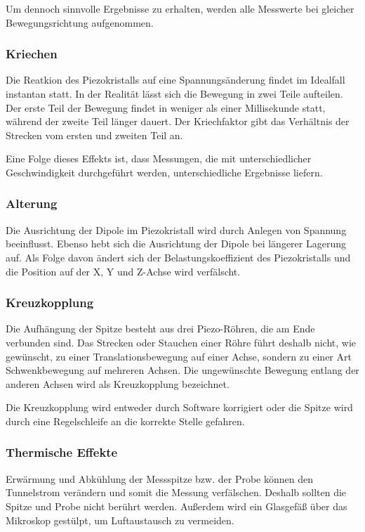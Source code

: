 Um dennoch sinnvolle Ergebnisse zu erhalten, werden alle Messwerte bei gleicher Bewegungsrichtung aufgenommen.

\subsubsection{Kriechen}
Die Reatkion des Piezokristalls auf eine Spannungsänderung findet im Idealfall instantan statt.
In der Realität lässt sich die Bewegung in zwei Teile aufteilen.
Der erste Teil der Bewegung findet in weniger als einer Millisekunde statt, während der zweite Teil länger dauert.
Der Kriechfaktor gibt das Verhältnis der Strecken vom ersten und zweiten Teil an.

Eine Folge dieses Effekts ist, dass Messungen, die mit unterschiedlicher Geschwindigkeit durchgeführt werden, unterschiedliche Ergebnisse liefern.

\subsubsection{Alterung}
Die Ausrichtung der Dipole im Piezokristall wird durch Anlegen von Spannung beeinflusst.
Ebenso hebt sich die Ausrichtung der Dipole bei längerer Lagerung auf.
Als Folge davon ändert sich der Belastungskoeffizient des Piezokristalls und die Position auf der X, Y und Z-Achse wird verfälscht.

\subsubsection{Kreuzkopplung}

Die Aufhängung der Spitze besteht aus drei Piezo-Röhren, die am Ende verbunden sind.
Das Strecken oder Stauchen einer Röhre führt deshalb nicht, wie gewünscht, zu einer Translationsbewegung auf einer Achse, sondern zu einer Art Schwenkbewegung auf mehreren Achsen.
Die ungewünschte Bewegung entlang der anderen Achsen wird als Kreuzkopplung bezeichnet.

Die Kreuzkopplung wird entweder durch Software korrigiert oder die Spitze wird durch eine Regelschleife an die korrekte Stelle gefahren.

\subsubsection{Thermische Effekte}
Erwärmung und Abkühlung der Messspitze bzw. der Probe können den Tunnelstrom verändern und somit die Messung verfälschen.
Deshalb sollten die Spitze und Probe nicht berührt werden.
Außerdem wird ein Glasgefäß über das Mikroskop gestülpt, um Luftaustausch zu vermeiden.